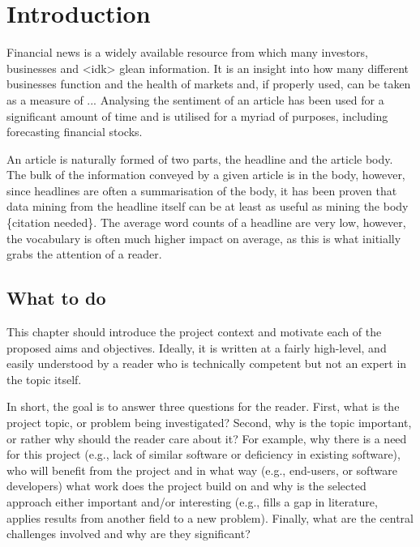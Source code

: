 \documentclass[ oneside,%
                    author={Joshua Felmeden},
                    degree={MEng},
                     title={Semantic Analysis of Financial Headlines Based on Realised Stock Returns},
                  subtitle={}]{dissertation}
\begin{document}

%

\mainmatter


\chapter{Introduction}
\label{chap:context}
Financial news is a widely available resource from which many investors, businesses and <idk> glean information. It is an insight into how many different businesses function and the health of markets and, if properly used, can be taken as a measure of ... Analysing the sentiment of an article has been used for a significant amount of time and is utilised for a myriad of purposes, including forecasting financial stocks.

An article is naturally formed of two parts, the headline and the article body. The bulk of the information conveyed by a given article is in the body, however, since headlines are often a summarisation of the body, it has been proven that data mining from the headline itself can be at least as useful as mining the body \{citation needed\}. The average word counts of a headline are very low, however, the vocabulary is often much higher impact on average, as this is what initially grabs the attention of a reader.

\section{What to do}

\noindent
This chapter should introduce the project context and motivate each of the proposed aims and objectives.  Ideally, it is written at a fairly high-level, and easily understood by a reader who is technically competent but not an expert in the topic itself.

In short, the goal is to answer three questions for the reader.  First, what is the project topic, or problem being investigated?  Second, why is the topic important, or rather why should the reader care about it?  For example, why there is a need for this project (e.g., lack of similar software or deficiency in existing software), who will benefit from the project and in what way (e.g., end-users, or software developers) what work does the project build on and why is the selected approach either important and/or interesting (e.g., fills a gap in literature, applies results from another field to a new problem).  Finally, what are the central challenges involved and why are they significant? 
 
\end{document}
